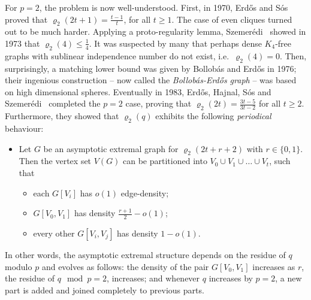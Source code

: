 \documentclass[11pt, a4paper]{article}
\def\pseudop{{\star}}
\newtheorem{theorem}{Theorem}[section]
\theoremstyle{definition}
\begin{document}
For $p=2$, the problem is now well-understood. First, in
1970, Erd\H{o}s and S\'os~\cite{ES} proved that $\varrho_2(2t+1) = \frac{t-1}{t}$, for all $t \geq 1$.
The case of even cliques turned out to be much harder. Applying a proto-regularity lemma, Szemer\'edi~\cite{SzK4} showed in 1973 that $\varrho_2(4) \leq \frac{1}{4}$. It was suspected by many that perhaps dense $K_4$-free graphs with sublinear independence number do not exist, i.e.~$\varrho_2(4)=0$. Then, surprisingly, a matching lower bound was given by Bollob\'as and Erd\H{o}s in 1976; their ingenious construction -- now called the \emph{Bollob\'as-Erd\H{o}s graph} -- was based on high dimensional spheres. 
Eventually in 1983, Erd\H{o}s, Hajnal, S\'os and Szemer\'edi~\cite{EHSSz} completed the $p=2$ case, proving that $\varrho_2(2t)=\frac{3t-5}{3t-2}$ for all $t \geq 2$. Furthermore, they showed that $\varrho_2(q)$ exhibits the following \emph{periodical} behaviour:
\begin{itemize}
	\item[$(\pseudop)$] Let $G$ be an asymptotic extremal graph for $\varrho_2(2t+r+2)$ with $r\in\{0,1\}$. Then the vertex set $V(G)$ can be partitioned into $V_0\cup V_1\cup \ldots \cup V_t$, such that
	\begin{itemize}
		\item each $G[V_i]$ has $o(1)$ edge-density;
		
		\item $G[V_0,V_1]$ has density $\frac{r+1}{2}-o(1)$; 
		
		\item every other $G[V_i,V_j]$ has density $1-o(1)$.
	\end{itemize}
\end{itemize}
In other words, the asymptotic extremal structure depends on the residue of $q$ modulo $p$ and evolves as follows: the density of the pair $G[V_0,V_1]$ increases as $r$, the residue of $q\!\mod p=2$, increases; and whenever $q$ increases by $p=2$, a new part is added and joined completely to previous parts.


\end{document}
